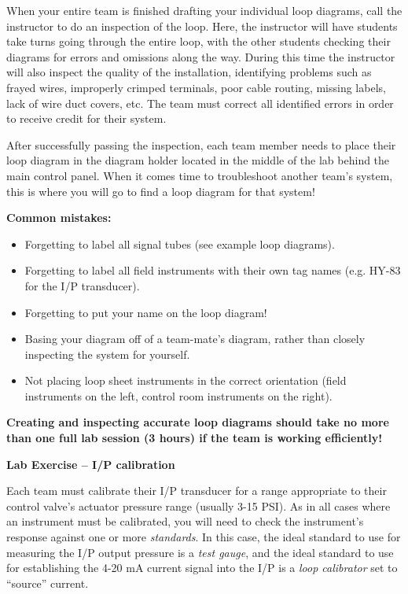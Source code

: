 \documentclass[12pt,a4paper]{article}
\begin{document}
\begin{itemize}
When your entire team is finished drafting your individual loop diagrams, call the instructor to do an inspection of the loop.  Here, the instructor will have students take turns going through the entire loop, with the other students checking their diagrams for errors and omissions along the way.  During this time the instructor will also inspect the quality of the installation, identifying problems such as frayed wires, improperly crimped terminals, poor cable routing, missing labels, lack of wire duct covers, etc.  The team must correct all identified errors in order to receive credit for their system.  

After successfully passing the inspection, each team member needs to place their loop diagram in the diagram holder located in the middle of the lab behind the main control panel.  When it comes time to troubleshoot another team's system, this is where you will go to find a loop diagram for that system!

\vskip 10pt

{\bf Common mistakes:}

\begin{itemize}
\item{} Forgetting to label all signal tubes (see example loop diagrams).
\item{} Forgetting to label all field instruments with their own tag names (e.g. HY-83 for the I/P transducer).
\item{} Forgetting to put your name on the loop diagram!
\item{} Basing your diagram off of a team-mate's diagram, rather than closely inspecting the system for yourself.
\item{} Not placing loop sheet instruments in the correct orientation (field instruments on the left, control room instruments on the right).
\end{itemize}

\vskip 10pt

{\bf Creating and inspecting accurate loop diagrams should take no more than one full lab session (3 hours) if the team is working efficiently!}





\vfil \eject

\noindent
{\bf Lab Exercise -- I/P calibration}

\vskip 5pt

Each team must calibrate their I/P transducer for a range appropriate to their control valve's actuator pressure range (usually 3-15 PSI).  As in all cases where an instrument must be calibrated, you will need to check the instrument's response against one or more {\it standards}.  In this case, the ideal standard to use for measuring the I/P output pressure is a {\it test gauge}, and the ideal standard to use for establishing the 4-20 mA current signal into the I/P is a {\it loop calibrator} set to ``source'' current.


\end{itemize}
\end{document}
